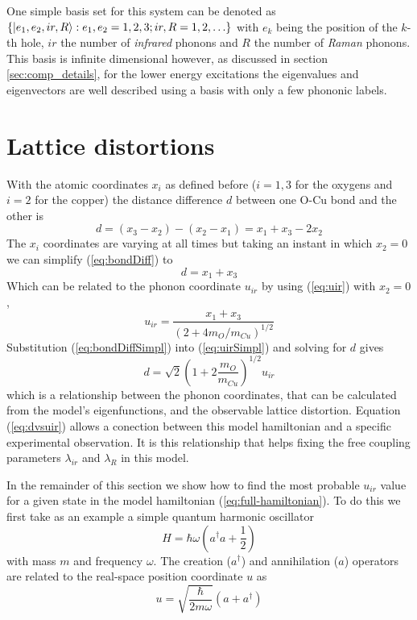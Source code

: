 One simple basis set for this system can be denoted as $\{\left | e_1,e_2,ir,R \right\rangle: e_1,e_2=1,2,3; ir,R=1,2,\ldots\}$ with $e_k$ being the position of the $k$-th hole, $ir$ the number of \textit{infrared} phonons and $R$ the number of \textit{Raman} phonons. 
This basis is infinite dimensional however, as discussed in section \ref{sec:comp_details}, for the lower energy excitations the eigenvalues and eigenvectors are well described using a basis with only a few phononic labels.

\section{Lattice distortions}
\label{sec:lattice-distortions}

With the atomic coordinates $x_i$ as defined before ($i=1,3$ for the oxygens and $i=2$ for the copper) the distance difference $d$ between one O-Cu bond and the other is
%
\begin{equation}
  \label{eq:bondDiff}
  d =  (x_3 - x_2) - (x_2 - x_1) = x_1 + x_3 - 2x_2 
\end{equation}
%
The $x_i$ coordinates are varying at all times but taking an instant in which $x_2=0$ we can simplify (\ref{eq:bondDiff}) to
%
\begin{equation}
  \label{eq:bondDiffSimpl}
  d = x_1+x_3
\end{equation}
%
Which can be related to the phonon coordinate $u_{ir}$ by using (\ref{eq:uir}) with $x_2=0$,
%
\begin{equation}
  \label{eq:uirSimpl}
  u_{ir}=\frac{x_1+x_3}{\left( 2+4 m_O/m_{Cu} \right)^{1/2}}
\end{equation}
%
Substitution (\ref{eq:bondDiffSimpl}) into (\ref{eq:uirSimpl}) and solving for $d$ gives
%
\begin{equation}
  \label{eq:dvsuir}
  d=\sqrt{2}\left(1 + 2\frac{m_O}{m_{Cu}} \right)^{1/2}u_{ir}
\end{equation}
%
which is a relationship between the phonon coordinates, that can be calculated from the model's eigenfunctions, and the observable lattice distortion.
Equation (\ref{eq:dvsuir}) allows a conection between this model hamiltonian and a specific experimental observation. 
It is this relationship that helps fixing the free coupling parameters $\lambda_{ir}$ and $\lambda_R$ in this model.

In the remainder of this section we show how to find the most probable $u_{ir}$ value for a given state in the model hamiltonian (\ref{eq:full-hamiltonian}).
To do this we first take as an example a simple quantum harmonic oscillator 
%
\begin{equation}
  \label{eq:harmOscHam}
  H=\hbar\omega \left(a^\dagger a + \frac{1}{2}\right)
\end{equation}
with mass $m$ and frequency $\omega$.
The creation ($a^\dagger$) and annihilation ($a$) operators are related to the real-space position coordinate $u$ as
%
\begin{equation}
  \label{eq:harmOscRel}
  u=\sqrt{\frac{\hbar}{2m\omega}}\left(a+a^\dagger\right)
\end{equation}

